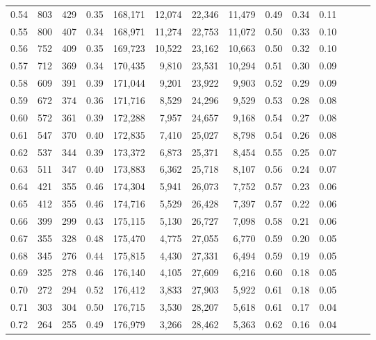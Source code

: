 \begin{tabular}{rrrrrrrrrrrrrr}
0.54 &    803 &  429 &  0.35 &  168,171 &   12,074 &  22,346 &  11,479 &  0.49 &  0.34 &      0.11 \\
0.55 &    800 &  407 &  0.34 &  168,971 &   11,274 &  22,753 &  11,072 &  0.50 &  0.33 &      0.10 \\
0.56 &    752 &  409 &  0.35 &  169,723 &   10,522 &  23,162 &  10,663 &  0.50 &  0.32 &      0.10 \\
0.57 &    712 &  369 &  0.34 &  170,435 &    9,810 &  23,531 &  10,294 &  0.51 &  0.30 &      0.09 \\
0.58 &    609 &  391 &  0.39 &  171,044 &    9,201 &  23,922 &   9,903 &  0.52 &  0.29 &      0.09 \\
0.59 &    672 &  374 &  0.36 &  171,716 &    8,529 &  24,296 &   9,529 &  0.53 &  0.28 &      0.08 \\
0.60 &    572 &  361 &  0.39 &  172,288 &    7,957 &  24,657 &   9,168 &  0.54 &  0.27 &      0.08 \\
0.61 &    547 &  370 &  0.40 &  172,835 &    7,410 &  25,027 &   8,798 &  0.54 &  0.26 &      0.08 \\
0.62 &    537 &  344 &  0.39 &  173,372 &    6,873 &  25,371 &   8,454 &  0.55 &  0.25 &      0.07 \\
0.63 &    511 &  347 &  0.40 &  173,883 &    6,362 &  25,718 &   8,107 &  0.56 &  0.24 &      0.07 \\
0.64 &    421 &  355 &  0.46 &  174,304 &    5,941 &  26,073 &   7,752 &  0.57 &  0.23 &      0.06 \\
0.65 &    412 &  355 &  0.46 &  174,716 &    5,529 &  26,428 &   7,397 &  0.57 &  0.22 &      0.06 \\
0.66 &    399 &  299 &  0.43 &  175,115 &    5,130 &  26,727 &   7,098 &  0.58 &  0.21 &      0.06 \\
0.67 &    355 &  328 &  0.48 &  175,470 &    4,775 &  27,055 &   6,770 &  0.59 &  0.20 &      0.05 \\
0.68 &    345 &  276 &  0.44 &  175,815 &    4,430 &  27,331 &   6,494 &  0.59 &  0.19 &      0.05 \\
0.69 &    325 &  278 &  0.46 &  176,140 &    4,105 &  27,609 &   6,216 &  0.60 &  0.18 &      0.05 \\
0.70 &    272 &  294 &  0.52 &  176,412 &    3,833 &  27,903 &   5,922 &  0.61 &  0.18 &      0.05 \\
0.71 &    303 &  304 &  0.50 &  176,715 &    3,530 &  28,207 &   5,618 &  0.61 &  0.17 &      0.04 \\
0.72 &    264 &  255 &  0.49 &  176,979 &    3,266 &  28,462 &   5,363 &  0.62 &  0.16 &      0.04 \\

\end{tabular}
